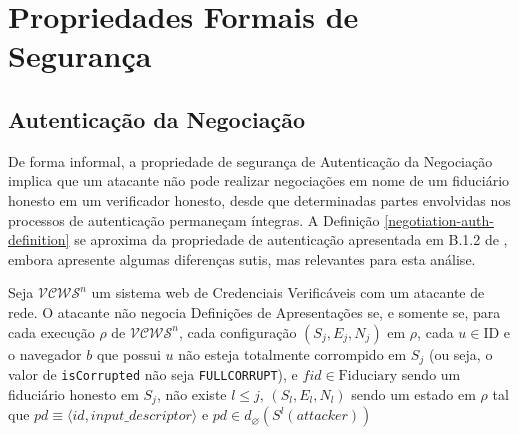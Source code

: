 \section{Propriedades Formais de Segurança}

\subsection{Autenticação da Negociação}

De forma informal, a propriedade de segurança de Autenticação da Negociação implica que um atacante não pode realizar negociações em nome de um fiduciário honesto em um verificador honesto, desde que determinadas partes envolvidas nos processos de autenticação permaneçam íntegras. A Definição \ref{negotiation-auth-definition} se aproxima da propriedade de autenticação apresentada em B.1.2 de \cite{hauck2023openid}, embora apresente algumas diferenças sutis, mas relevantes para esta análise.

\begin{definicao}\label{negotiation-auth-definition}
Seja $\mathcal{VCWS}^n$ um sistema web de Credenciais Verificáveis com um atacante de rede. 
O atacante não negocia Definições de Apresentações se, e somente se, para cada execução $\rho$ de $\mathcal{VCWS}^n$, cada configuração $(S_j, E_j, N_j)$ em $\rho$, 
cada $u \in \text{ID}$ e o navegador $b$ que possui $u$ não esteja totalmente corrompido em $S_j$ (ou seja, o valor de \texttt{isCorrupted} não seja \texttt{FULLCORRUPT}), e $fid \in \text{Fiduciary}$ sendo um fiduciário honesto em $S_j$, 
não existe \( l \leq j \), \( (S_l, E_l, N_l) \) sendo um estado em \( \rho \) tal que $pd \equiv \langle id, input\_descriptor \rangle$ e  \( pd \in d_\varnothing (S^l(attacker)) \)
\end{definicao}